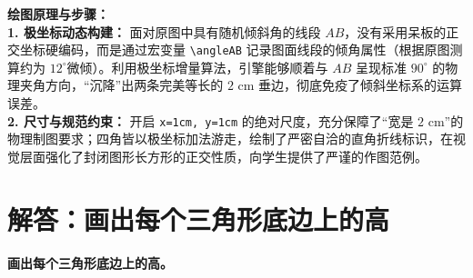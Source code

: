 \vspace{0.4cm}
{\small\color{blue!70!black}
\textbf{绘图原理与步骤：}\\
\textbf{1. 极坐标动态构建：} 面对原图中具有随机倾斜角的线段 $AB$，没有采用呆板的正交坐标硬编码，而是通过宏变量 \texttt{\textbackslash angleAB} 记录图面线段的倾角属性（根据原图测算约为 $12^\circ$微倾）。利用极坐标增量算法，引擎能够顺着与 $AB$ 呈现标准 $90^\circ$ 的物理夹角方向，“沉降”出两条完美等长的 $2\text{ cm}$ 垂边，彻底免疫了倾斜坐标系的运算误差。\\
\textbf{2. 尺寸与规范约束：} 开启 \texttt{x=1cm, y=1cm} 的绝对尺度，充分保障了“宽是 $2\text{ cm}$”的物理制图要求；四角皆以极坐标加法游走，绘制了严密自洽的直角折线标识，在视觉层面强化了封闭图形长方形的正交性质，向学生提供了严谨的作图范例。
}

\newpage




\section{解答：画出每个三角形底边上的高}

\vspace{0.4cm}

\noindent\textbf{画出每个三角形底边上的高。}

\vspace{0.8cm}

